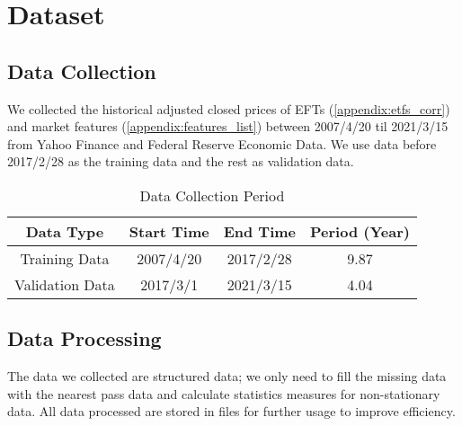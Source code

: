 \section{Dataset}
\subsection{Data Collection}
We collected the historical adjusted closed prices of EFTs (\autoref{appendix:etfs_corr}) and market features (\autoref{appendix:features_list}) between 2007/4/20 til  2021/3/15 from Yahoo Finance and Federal Reserve Economic Data. We use data before 2017/2/28 as the training data and the rest as validation data.
\begin{table}[ht]
    \centering
        \begin{tabular}{|c|c|c|c|}
        \hline \hline
        Data Type & Start Time & End Time & Period (Year) \\ \hline
        Training Data  &  2007/4/20 & 2017/2/28 & 9.87\\ \hline
        Validation Data & 2017/3/1 & 2021/3/15 & 4.04 \\ 
        \hline \hline
        \end{tabular}
    \caption{Data Collection Period}
    \label{tab:dataset}
\end{table}


\subsection{Data Processing}
The data we collected are structured data; we only need to fill the missing data with the nearest pass data and calculate statistics measures for non-stationary data.  All data processed are stored in files for further usage to improve efficiency. 